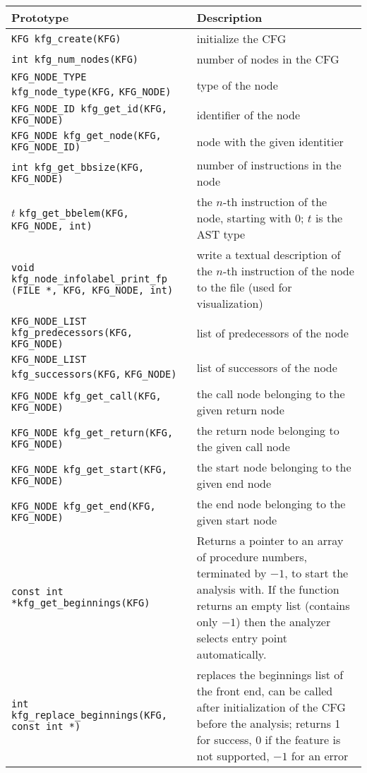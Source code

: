 \documentclass[12pt]{article}
\begin{document}
\begin{longtable}{|p{} | p{}|}
\hline
Prototype & Description \\
\hline
\hline \endhead
\verb|KFG kfg_create(KFG)| & initialize the CFG \\
\hline
\verb|int kfg_num_nodes(KFG)| & number of nodes in the CFG \\
\hline
\verb|KFG_NODE_TYPE kfg_node_type(KFG,| \verb|KFG_NODE)|
    & type of the node \\
\hline
\verb|KFG_NODE_ID kfg_get_id(KFG,| \verb|KFG_NODE)|
    & identifier of the node \\
\hline
\verb|KFG_NODE kfg_get_node(KFG,| \verb|KFG_NODE_ID)|
    & node with the given identitier \\
\hline
\verb|int kfg_get_bbsize(KFG, KFG_NODE)|
    & number of instructions in the node \\
\hline
\(t\) \verb|kfg_get_bbelem(KFG, KFG_NODE, int)|
    & the \(n\)-th instruction of the node, starting with 0; \(t\) is
      the AST type \\
\hline
\raggedright \verb|void kfg_node_infolabel_print_fp|
    \verb|(FILE *, KFG, KFG_NODE, int)|
    & write a textual description of the \(n\)-th instruction of the node
      to the file (used for visualization) \\
\hline
\verb|KFG_NODE_LIST kfg_predecessors(KFG,| \verb|KFG_NODE)|
    & list of predecessors of the node \\
\hline
\verb|KFG_NODE_LIST kfg_successors(KFG,| \verb|KFG_NODE)|
    & list of successors of the node \\
\hline
\verb|KFG_NODE kfg_get_call(KFG,| \verb|KFG_NODE)|
    & the call node belonging to the given return node \\
\hline
\verb|KFG_NODE kfg_get_return(KFG,| \verb|KFG_NODE)|
    & the return node belonging to the given call node \\
\hline
\verb|KFG_NODE kfg_get_start(KFG,| \verb|KFG_NODE)|
    & the start node belonging to the gi\-ven end node \\
\hline
\verb|KFG_NODE kfg_get_end(KFG, KFG_NODE)|
    & the end node belonging to the given start node \\
\hline
\verb|const int *kfg_get_beginnings(KFG)|
    & Returns a pointer to an array of procedure numbers, terminated by
      \(-1\), to start the analysis with. If the function returns an
      empty list (contains only \(-1\)) then the analyzer selects entry
      point automatically. \\
\hline
\verb|int kfg_replace_beginnings(KFG,| \verb|const int *)|
    & replaces the beginnings list of the front end, can be called after
      initialization of the CFG before the analysis; returns 1 for
      success, 0 if the feature is not supported, \(-1\) for an error \\
\hline
\end{longtable}
\end{document}

